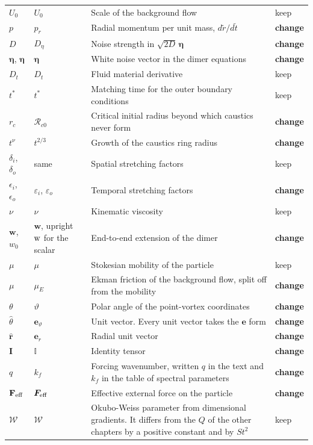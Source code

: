 \documentclass[11pt,a4paper]{article}
\renewcommand{\vec}[1]{\boldsymbol{#1}}
\newcommand{\chg}{\textbf{change}}
\newcommand{\kp}{keep}
\begin{document}
\begin{longtable}{@{}p{3.1cm} p{3.1cm} p{8.6cm} p{1.6cm}@{}}
$U_0$ & $U_0$ & Scale of the background flow & \kp \\
$p$ & $p_r$ & Radial momentum per unit mass, $d\tilde{r}/d\tilde{t}$ & \chg \\
$D$ & $D_\eta$ & Noise strength in $\sqrt{2D}\,\bm{\eta}$ & \chg \\
$\bm{\eta}$, $\mathbf{\eta}$ & $\vec{\eta}$ & White noise vector in the dimer equations & \chg \\
$D_t$ & $D_t$ & Fluid material derivative & \kp \\
$t^*$ & $t^*$ & Matching time for the outer boundary conditions & \kp \\
$r_c$ & $\mathcal{R}_{c0}$ & Critical initial radius beyond which caustics never form & \chg \\
$t^{\nu}$ & $t^{2/3}$ & Growth of the caustics ring radius & \chg \\
$\delta_i$, $\delta_o$ & same & Spatial stretching factors & \kp \\
$\epsilon_i$, $\epsilon_o$ & $\varepsilon_i$, $\varepsilon_o$ & Temporal stretching factors & \chg \\
$\nu$ & $\nu$ & Kinematic viscosity & \kp \\
$\mathbf{w}$, $w_0$ & $\mathbf{w}$, upright $\rm w$ for the scalar & End-to-end extension of the dimer & \chg \\
$\mu$ & $\mu$ & Stokesian mobility of the particle & \kp \\
$\mu$ & $\mu_E$ & Ekman friction of the background flow, split off from the mobility & \chg \\
$\theta$ & $\vartheta$ & Polar angle of the point-vortex coordinates & \chg \\
$\hat{\theta}$ & $\vec{e}_\vartheta$ & Unit vector. Every unit vector takes the $\vec{e}$ form & \chg \\
$\mathbf{\hat{r}}$ & $\vec{e}_r$ & Radial unit vector & \chg \\
$\textbf{I}$ & $\mathbb{I}$ & Identity tensor & \chg \\
$q$ & $k_f$ & Forcing wavenumber, written $q$ in the text and $k_f$ in the table of spectral parameters & \chg \\
$\textbf{F}_{\textnormal{eff}}$ & $\vec{F}_{\rm eff}$ & Effective external force on the particle & \chg \\
$\mathcal{W}$ & $\mathcal{W}$ & Okubo-Weiss parameter from dimensional gradients. It differs from the $Q$ of the other chapters by a positive constant and by $St^2$ & \kp \\

\end{longtable}
\end{document}
